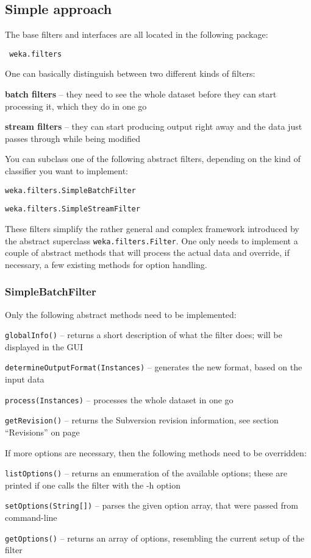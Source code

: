 \subsection{Simple approach}
The base filters and interfaces are all located in the following package:
\begin{verbatim}
 weka.filters
\end{verbatim}
One can basically distinguish between two different kinds of filters:
\begin{tight_itemize}
  \item \textbf{batch filters} -- they need to see the whole dataset before they
can start processing it, which they do in one go
  \item \textbf{stream filters} -- they can start producing output right away
and the data just passes through while being modified
\end{tight_itemize}
You can subclass one of the following abstract filters, depending on the kind of
classifier you want to implement:
\begin{tight_itemize}
  \item \texttt{weka.filters.SimpleBatchFilter}
  \item \texttt{weka.filters.SimpleStreamFilter}
\end{tight_itemize}
These filters simplify the rather general and complex framework introduced by
the abstract superclass \texttt{weka.filters.Filter}. One only needs to
implement a couple of abstract methods that will process the actual data and
override, if necessary, a few existing methods for option handling.

\subsubsection{SimpleBatchFilter}
Only the following abstract methods need to be implemented:
\begin{tight_itemize}
  \item \texttt{globalInfo()} -- returns a short description of what the
filter does; will be displayed in the GUI
  \item \texttt{determineOutputFormat(Instances)} -- generates the new
format, based on the input data
  \item \texttt{process(Instances)} -- processes the whole dataset in one
go
  \item \texttt{getRevision()} -- returns the Subversion revision information,
see section ``Revisions'' on page \pageref{filter_revisions}
\end{tight_itemize}
If more options are necessary, then the following methods need to be overridden:
\begin{tight_itemize}
  \item \texttt{listOptions()} -- returns an enumeration of the available
options; these are printed if one calls the filter with the -h option
  \item \texttt{setOptions(String[])} -- parses the given option array,
that were passed from command-line
  \item \texttt{getOptions()} -- returns an array of options, resembling
the current setup of the filter
\end{tight_itemize}

